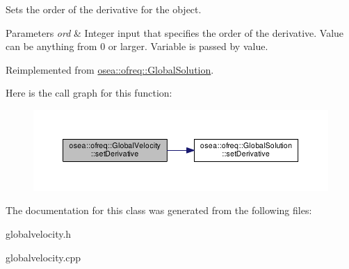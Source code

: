 Sets the order of the derivative for the object. 


\begin{DoxyParams}{Parameters}
{\em ord} & Integer input that specifies the order of the derivative. Value can be anything from 0 or larger. Variable is passed by value. \\
\hline
\end{DoxyParams}


Reimplemented from \hyperlink{classosea_1_1ofreq_1_1_global_solution_a537163391f1f55d073720b20f69acfa5}{osea\-::ofreq\-::\-Global\-Solution}.



Here is the call graph for this function\-:
\nopagebreak
\begin{figure}[H]
\begin{center}
\leavevmode
\includegraphics[width=350pt]{classosea_1_1ofreq_1_1_global_velocity_a11229a6dbc7f85f3c321b5eddb127f10_cgraph}
\end{center}
\end{figure}




The documentation for this class was generated from the following files\-:\begin{DoxyCompactItemize}
\item 
globalvelocity.\-h\item 
globalvelocity.\-cpp\end{DoxyCompactItemize}
